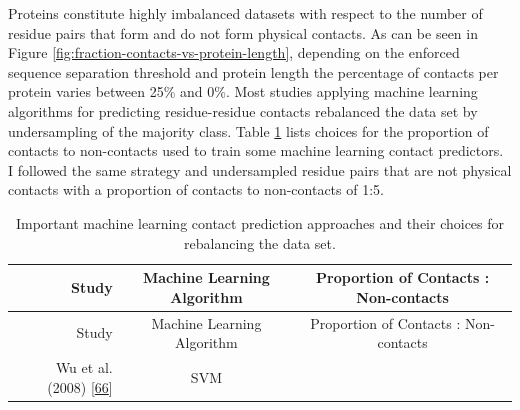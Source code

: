 \documentclass[11pt,a4paper,twoside]{book}
\theoremstyle{definition}
\theoremstyle{definition}
\theoremstyle{remark}
\begin{document}
Proteins constitute highly imbalanced datasets with respect to the
number of residue pairs that form and do not form physical contacts. As
can be seen in Figure \ref{fig:fraction-contacts-vs-protein-length},
depending on the enforced sequence separation threshold and protein
length the percentage of contacts per protein varies between 25\% and
0\%. Most studies applying machine learning algorithms for predicting
residue-residue contacts rebalanced the data set by undersampling of the
majority class. Table \ref{tab:rebalancing-dataset} lists choices for
the proportion of contacts to non-contacts used to train some machine
learning contact predictors. I followed the same strategy and
undersampled residue pairs that are not physical contacts with a
proportion of contacts to non-contacts of 1:5.

\begin{longtable}[]{@{}rcc@{}}
\caption{\label{tab:rebalancing-dataset} Important machine learning contact
prediction approaches and their choices for rebalancing the data
set.}\tabularnewline
\toprule
\begin{minipage}[b]{0.32\columnwidth}\raggedleft\strut
Study\strut
\end{minipage} & \begin{minipage}[b]{0.19\columnwidth}\centering\strut
Machine Learning Algorithm\strut
\end{minipage} & \begin{minipage}[b]{0.29\columnwidth}\centering\strut
Proportion of Contacts : Non-contacts\strut
\end{minipage}\tabularnewline
\midrule
\endfirsthead
\toprule
\begin{minipage}[b]{0.32\columnwidth}\raggedleft\strut
Study\strut
\end{minipage} & \begin{minipage}[b]{0.19\columnwidth}\centering\strut
Machine Learning Algorithm\strut
\end{minipage} & \begin{minipage}[b]{0.29\columnwidth}\centering\strut
Proportion of Contacts : Non-contacts\strut
\end{minipage}\tabularnewline
\midrule
\endhead
\begin{minipage}[t]{0.32\columnwidth}\raggedleft\strut
Wu et al. (2008) {[}\protect\hyperlink{ref-Wu2008}{66}{]}\strut
\end{minipage} & \begin{minipage}[t]{0.19\columnwidth}\centering\strut
SVM\strut
\end{minipage} & \begin{minipage}[t]{0.29\columnwidth}\centering\strut

\end{minipage}
\end{longtable}
\end{document}

